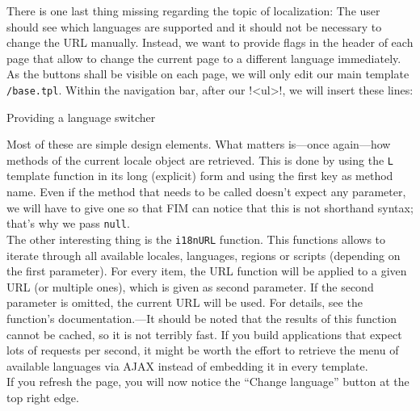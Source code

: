 \documentclass{scrartcl}
\begin{document}
      There is one last thing missing regarding the topic of localization: The user should see which languages are supported and it should not be necessary to change the URL manually. Instead, we want to provide flags in the header of each page that allow to change the current page to a different language immediately. \\
      As the buttons shall be visible on each page, we will only edit our main template \texttt{/base.tpl}. Within the navigation bar, after our \smarty!<ul>!, we will insert these lines: \enlargethispage{.7cm}
      \begin{listing}[H]
         \caption{Providing a language switcher}
      \end{listing}
      Most of these are simple design elements. What matters is---once again---how methods of the current locale object are retrieved. This is done by using the \texttt{L} template function in its long (explicit) form and using the first key as method name. Even if the method that needs to be called doesn't expect any parameter, we will have to give one so that FIM can notice that this is not shorthand syntax; that's why we pass \lstinline!null!. \\
      The other interesting thing is the \lstinline!i18nURL! function. This functions allows to iterate through all available locales, languages, regions or scripts (depending on the first parameter). For every item, the URL function will be applied to a given URL (or multiple ones), which is given as second parameter. If the second parameter is omitted, the current URL will be used. For details, see the function's documentation.---It should be noted that the results of this function cannot be cached, so it is not terribly fast. If you build applications that expect lots of requests per second, it might be worth the effort to retrieve the menu of available languages via AJAX instead of embedding it in every template. \\
      If you refresh the page, you will now notice the ``Change language'' button at the top right edge.
\end{document}
